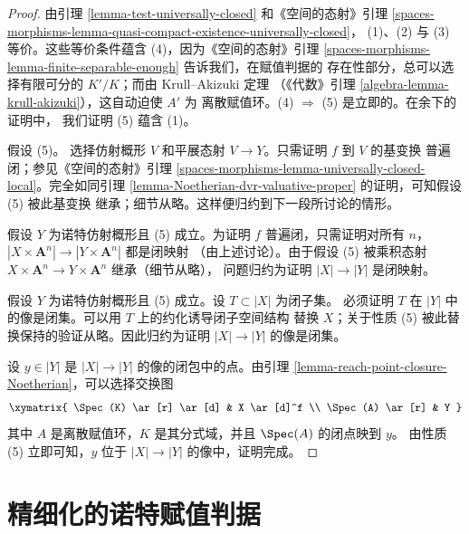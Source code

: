 \begin{proof}
由引理 \ref{lemma-test-universally-closed} 和《空间的态射》引理
\ref{spaces-morphisms-lemma-quasi-compact-existence-universally-closed}，
(1)、(2) 与 (3) 等价。这些等价条件蕴含 (4)，因为《空间的态射》引理
\ref{spaces-morphisms-lemma-finite-separable-enough} 告诉我们，在赋值判据的
存在性部分，总可以选择有限可分的 $K'/K$；而由 Krull--Akizuki 定理
（《代数》引理 \ref{algebra-lemma-krull-akizuki}），这自动迫使 $A'$ 为
离散赋值环。(4) $\Rightarrow$ (5) 是立即的。在余下的证明中，
我们证明 (5) 蕴含 (1)。

\medskip\noindent
假设 (5)。%
选择仿射概形 $V$ 和平展态射 $V \to Y$。只需证明 $f$ 到 $V$ 的基变换
普遍闭；参见《空间的态射》引理
\ref{spaces-morphisms-lemma-universally-closed-local}。完全如同引理
\ref{lemma-Noetherian-dvr-valuative-proper} 的证明，可知假设 (5) 被此基变换
继承；细节从略。这样便归约到下一段所讨论的情形。

\medskip\noindent
假设 $Y$ 为诺特仿射概形且 (5) 成立。为证明 $f$ 普遍闭，只需证明对所有 $n$，
$|X \times \mathbf{A}^n| \to |Y \times \mathbf{A}^n|$ 都是闭映射
（由上述讨论）。由于假设 (5) 被乘积态射
$X \times \mathbf{A}^n \to Y \times \mathbf{A}^n$ 继承（细节从略），
问题归约为证明 $|X| \to |Y|$ 是闭映射。

\medskip\noindent
假设 $Y$ 为诺特仿射概形且 (5) 成立。设 $T \subset |X|$ 为闭子集。
必须证明 $T$ 在 $|Y|$ 中的像是闭集。可以用 $T$ 上的约化诱导闭子空间结构
替换 $X$；关于性质 (5) 被此替换保持的验证从略。因此归约为证明
$|X| \to |Y|$ 的像是闭集。

\medskip\noindent
设 $y \in |Y|$ 是 $|X| \to |Y|$ 的像的闭包中的点。由引理
\ref{lemma-reach-point-closure-Noetherian}，可以选择交换图
$$
\xymatrix{
\Spec(K) \ar[r] \ar[d] & X \ar[d]^f \\
\Spec(A) \ar[r] & Y
}
$$
其中 $A$ 是离散赋值环，$K$ 是其分式域，并且 $\Spec(A)$ 的闭点映到 $y$。
由性质 (5) 立即可知，$y$ 位于 $|X| \to |Y|$ 的像中，证明完成。
\end{proof}


















\section{精细化的诺特赋值判据}
\label{section-refined-valuative-criteria}

